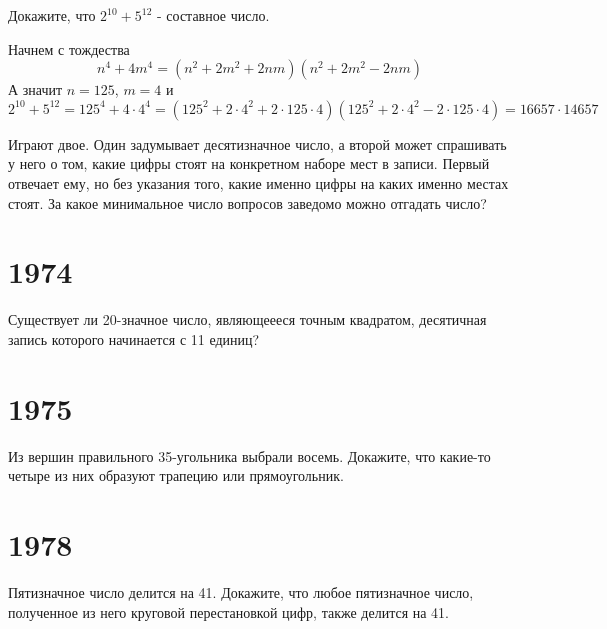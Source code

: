 \documentclass[11pt, a4paper]{common/document_template}
\begin{document}
\begin{exercise}[10]
Докажите, что $2^{10} + 5^{12}$ - составное число.
\end{exercise}

\begin{Solution}
Начнем с тождества
$$
n^{4} + 4m^{4} = (n^{2} + 2m^{2} + 2nm)(n^{2} + 2m^{2} - 2nm)
$$
А значит $n = 125$, $m = 4$ и
$$
2^{10} + 5^{12} = 125^{4} + 4 \cdot 4^{4} = (125^{2} + 2 \cdot 4^{2} + 2 \cdot 125 \cdot 4)(125^{2} + 2 \cdot 4^{2} - 2 \cdot 125 \cdot 4) = 16657 \cdot 14657
$$
\end{Solution}

\begin{exercise}[37]
Играют двое. Один задумывает десятизначное число, а второй может спрашивать у него о том, какие цифры стоят на конкретном наборе мест в записи. Первый отвечает ему, но без указания того, какие именно цифры на каких именно местах стоят. За какое минимальное число вопросов заведомо можно отгадать число?
\end{exercise}


\chapter{1974}

\begin{exercise}[25]
Существует ли 20-значное число, являющеееся точным квадратом, десятичная запись которого начинается с 11 единиц?
\end{exercise}

\chapter{1975}

\begin{exercise}[36]
Из вершин правильного 35-угольника выбрали восемь. Докажите, что какие-то четыре из них образуют трапецию или прямоугольник.
\end{exercise}


\chapter{1978}

\begin{exercise}[14]
Пятизначное число делится на 41. Докажите, что любое пятизначное число, полученное из него круговой перестановкой цифр, также делится на 41.
\end{exercise}
\end{document}
